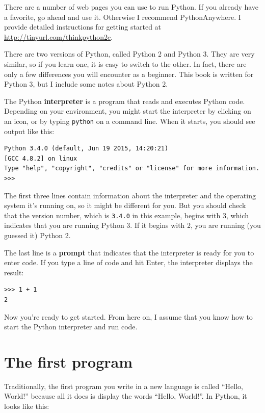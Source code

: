 \documentclass[10pt]{book}
\begin{document}
There are a number of web pages you can use to run Python.  If you
already have a favorite, go ahead and use it.  Otherwise I recommend
PythonAnywhere.  I provide detailed instructions for getting started
at \url{http://tinyurl.com/thinkpython2e}.

There are two versions of Python, called Python 2 and Python 3.
They are very similar, so if you learn one, it is easy to switch
to the other.  In fact, there are only a few differences you will
encounter as a beginner.
This book is written for Python 3, but I include some notes
about Python 2.

The Python {\bf interpreter} is a program that reads and executes
Python code.  Depending on your environment, you might start the
interpreter by clicking on an icon, or by typing {\tt python} on
a command line.
When it starts, you should see output like this:

\begin{verbatim}
Python 3.4.0 (default, Jun 19 2015, 14:20:21)
[GCC 4.8.2] on linux
Type "help", "copyright", "credits" or "license" for more information.
>>>
\end{verbatim}
%
The first three lines contain information about the interpreter
and the operating system it's running on, so it might be different for
you.  But you should check that the version number, which is
{\tt 3.4.0} in this example, begins with 3, which indicates that
you are running Python 3.  If it begins with 2, you are running
(you guessed it) Python 2.

The last line is a {\bf prompt} that indicates that the interpreter is
ready for you to enter code.
If you type a line of code and hit Enter, the interpreter displays the
result:

\begin{verbatim}
>>> 1 + 1
2
\end{verbatim}
%
Now you're ready to get started.
From here on, I assume that you know how to start the Python
interpreter and run code.


\section{The first program}
\label{hello}

Traditionally, the first program you write in a new language
is called ``Hello, World!'' because all it does is display the
words ``Hello, World!''.  In Python, it looks like this:
\end{document}

